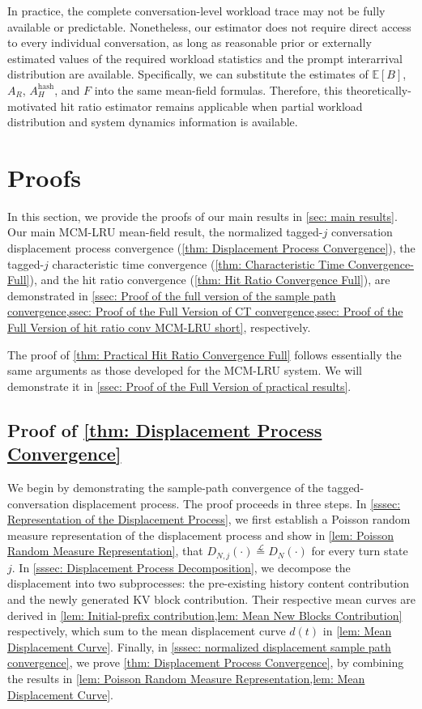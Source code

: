 \documentclass{article}
\theoremstyle{definition}
\newcommand{\E}{\mathbb E}
\begin{document}
In practice, the complete conversation-level workload trace may not be fully available or predictable. Nonetheless, our estimator does not require direct access to every individual conversation, as long as reasonable prior or externally estimated values of the required workload statistics and the prompt interarrival distribution are available. Specifically, we can substitute the estimates of $\E[B]$, $A_R$, $A_H^{\mathrm{hash}}$, and $F$ into the same mean-field formulas. Therefore, this theoretically-motivated hit ratio estimator remains applicable when partial workload distribution and system dynamics information is available.


\section{Proofs}
\label{sec: Proofs}

In this section, we provide the proofs of our main results in \cref{sec: main results}. Our main MCM-LRU mean-field result, the normalized tagged-$j$ conversation displacement process convergence (\cref{thm: Displacement Process Convergence}), the tagged-$j$ characteristic time convergence (\cref{thm: Characteristic Time Convergence- Full}), and the hit ratio convergence (\cref{thm: Hit Ratio Convergence Full}), are demonstrated in \cref{ssec: Proof of the full version of the sample path convergence,ssec: Proof of the Full Version of CT convergence,ssec: Proof of the Full Version of hit ratio conv MCM-LRU short}, respectively. 

The proof of \cref{thm: Practical Hit Ratio Convergence Full} follows essentially the same arguments as those developed for the MCM-LRU system. We will demonstrate it in \cref{ssec: Proof of the Full Version of practical results}.


\subsection{Proof of \cref{thm: Displacement Process Convergence}}
\label{ssec: Proof of the full version of the sample path convergence}


We begin by demonstrating the sample-path convergence of the tagged-conversation displacement process. The proof proceeds in three steps. In \cref{sssec: Representation of the Displacement Process}, we first establish a Poisson random measure representation of the displacement process and show in \cref{lem: Poisson Random Measure Representation}, that $D_{N,j}(\cdot)\stackrel{\mathcal L}{=}D_N(\cdot)$ for every turn state $j$. In \cref{sssec: Displacement Process Decomposition}, we decompose the displacement into two subprocesses: the pre-existing history content contribution and the newly generated KV block contribution. Their respective mean curves are derived in \cref{lem: Initial-prefix contribution,lem: Mean New Blocks Contribution} respectively, which sum to the mean displacement curve $d(t)$ in \cref{lem: Mean Displacement Curve}. Finally, in \cref{sssec: normalized displacement sample path convergence}, we prove \cref{thm: Displacement Process Convergence}, by combining the results in \cref{lem: Poisson Random Measure Representation,lem: Mean Displacement Curve}.
\end{document}

